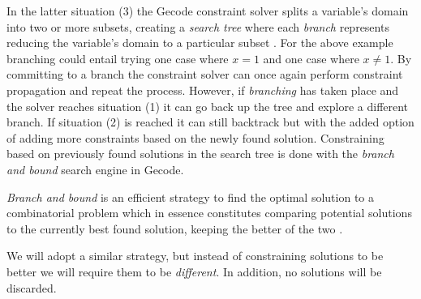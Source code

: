 In the latter situation (3) the Gecode constraint solver splits a variable's domain into
two or more subsets, creating a \textit{search tree} where each \textit{branch} represents
reducing the variable's domain to a particular subset \cite[Section~8]{MPG}. For the above
example branching could entail trying one case where $x=1$ and one case where $x\neq1$.
By committing to a branch the constraint solver can once again perform constraint
propagation and repeat the process. However, if \textit{branching} has taken place and the
solver reaches situation (1) it can go back up the tree and explore a different branch.
If situation (2) is reached it can still backtrack but with the added option of adding
more constraints based on the newly found solution. Constraining based on previously found
solutions in the search tree is done with the \textit{branch and bound} search
engine \cite[Section~9]{MPG} in Gecode.

\textit{Branch and bound} is an efficient strategy to find the optimal solution to a
combinatorial problem which in essence constitutes comparing potential solutions to the
currently best found solution, keeping the better of the two \cite{BaB}.

We will adopt a similar strategy, but instead of constraining solutions to be better we
will require them to be \textit{different}. In addition, no solutions will be discarded.
